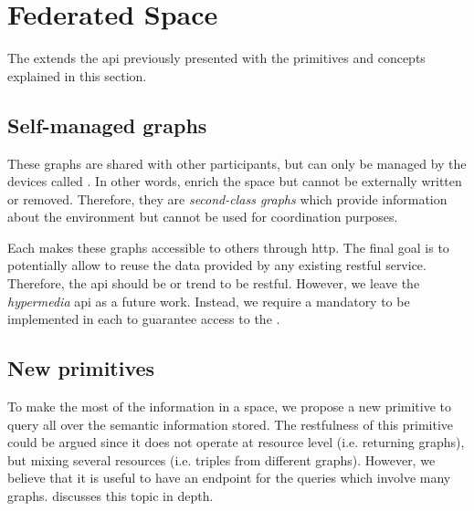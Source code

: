 \section{Federated Space}
\label{sec:federated_space}

The \osapi{} extends the \ac{api} previously presented with the primitives and concepts explained in this section.


\subsection{Self-managed graphs}

These graphs are shared with other participants, but can only be managed by the devices called \asteroids{}. %
In other words, \selfgraphs{} enrich the space but cannot be externally written or removed. %
Therefore, they are \emph{second-class graphs} which provide information about the environment but cannot be used for coordination purposes.


Each \asteroid{} makes these graphs accessible to others through \ac{http}.
The final goal is to potentially allow to reuse the data provided by any existing \ac{rest}ful service. %
Therefore, the \ac{api} should be or trend to be \ac{rest}ful.
However, we leave the \emph{hypermedia} \ac{api} as a future work.
Instead, we require a mandatory \osapi{} to be implemented in each \asteroid{} to guarantee access to the \selfgraphs{}.


\subsection{New primitives}

To make the most of the information in a space, we propose a new primitive to query all over the semantic information stored.
The \ac{rest}fulness of this primitive could be argued since it does not operate at resource level (i.e. returning graphs), but mixing several resources (i.e. triples from different graphs).
However, we believe that it is useful to have an endpoint for the queries which involve many graphs.
\citet{kjernsmo_necessity_2012} discusses this topic in depth. %

